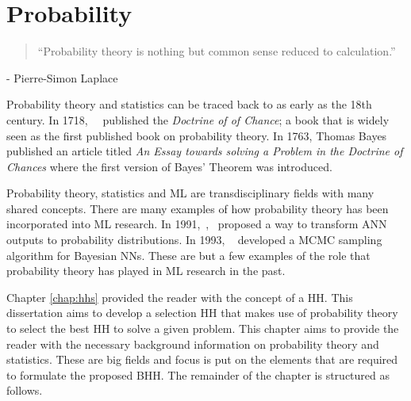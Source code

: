 \chapter{Probability}
\label{chap:probability}

\begin{quotation}
      \noindent ``Probability theory is nothing but common sense reduced to calculation.''
\end{quotation}
\begin{flushright}
      - Pierre-Simon Laplace
\end{flushright}

\noindent
Probability theory and statistics can be traced back to as early as the 18th century. In 1718,~\citeauthor{ref:demoivre:1718}~\cite{ref:demoivre:1718} published the \textit{Doctrine of of Chance}; a book that is widely seen as the first published book on probability theory. In 1763, Thomas Bayes~\cite{ref:bayes:1763} published an article titled \textit{An Essay towards solving a Problem in the Doctrine of Chances} where the first version of Bayes' Theorem was introduced.

Probability theory, statistics and \acf{ML} are transdisciplinary fields with many shared concepts. There are many examples of how probability theory has been incorporated into \acs{ML} research. In 1991,~\citeauthor{ref:denker:1991},~\cite{ref:denker:1991} proposed a way to transform \acf{ANN} outputs to probability distributions. In 1993, \citeauthor{ref:neal:1993}~\cite{ref:neal:1993} developed a \acf{MCMC} sampling algorithm for Bayesian \acp{NN}. These are but a few examples of the role that probability theory has played in \acs{ML} research in the past.

Chapter \ref{chap:hhs} provided the reader with the concept of a \acf{HH}. This dissertation aims to develop a selection \acs{HH} that makes use of probability theory to select the best \acs{HH} to solve a given problem. This chapter aims to provide the reader with the necessary background information on probability theory and statistics. These are big fields and focus is put on the elements that are required to formulate the proposed \acf{BHH}. The remainder of the chapter is structured as follows.

